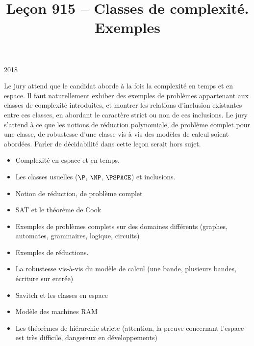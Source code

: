 \documentclass{agregfiche}
\title{Leçon 915 -- Classes de complexité. Exemples}
\begin{document}
\maketitle

\secrapports

\begin{rapport}{2018}

Le jury attend que le candidat aborde à la fois la complexité en temps et en
espace. Il faut naturellement exhiber des exemples de problèmes appartenant aux
classes de complexité introduites, et montrer les relations d’inclusion
existantes entre ces classes, en abordant le caractère strict ou non de ces
inclusions. Le jury s’attend à ce que les notions de réduction polynomiale, de
problème complet pour une classe, de robustesse d’une classe vis à vis des
modèles de calcul soient abordées. Parler de décidabilité dans cette leçon
serait hors sujet.

\end{rapport}

\secindispensables

\begin{itemize}
    \item Complexité en espace et en temps.
    \item Les classes usuelles ($\P$, $\NP$, $\PSPACE$) et inclusions.
    \item Notion de réduction, de problème complet
    \item SAT et le théorème de Cook


\end{itemize}

\secasavoir

\begin{itemize}
	\item Exemples de problèmes complets sur des
          domaines différents (graphes, automates,
          grammaires, logique, circuits)
        \item Exemples de réductions.
	\item La robustesse vis-à-vis du modèle de calcul (une bande, plusieurs
          bandes, écriture sur entrée)
	\item Savitch et les classes en espace
        \item Modèle des machines RAM
        \item Les théorèmes de hiérarchie stricte (attention, la preuve concernant l'espace est très difficile, dangereux en développements)
\end{itemize}
\end{document}
